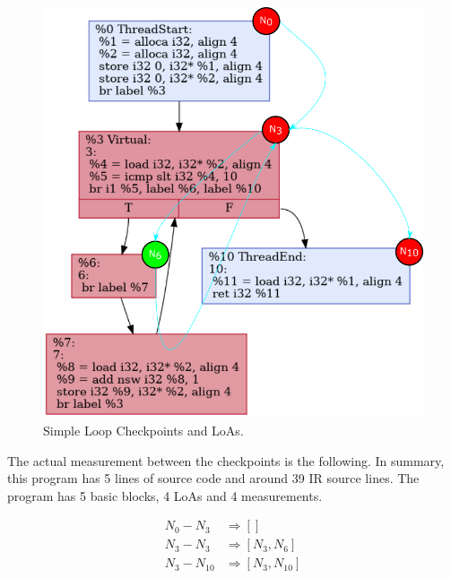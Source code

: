 \begin{figure}[ht]
    \centerline{\includegraphics[scale=.60]{Figures/05/simple-loop-loa.png}}
    \caption{Simple Loop Checkpoints and LoAs.} 
    \label{fig:simple-loop-loa}
    \vspace{20cm}
\end{figure}

The actual measurement between the checkpoints is the following. In summary,
this program has 5 lines of source code and around 39 IR source lines. The
program has 5 basic blocks, 4 LoAs and 4 measurements.

\begin{align*}  
    N_0 - N_3 &\Rightarrow [] \\
    N_3 - N_3 &\Rightarrow [N_3, N_6] \\
    N_3 - N_{10} &\Rightarrow [N_3, N_{10}] \\
\end{align*}
